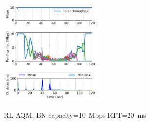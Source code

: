 \documentclass[conference]{IEEEtran}
\begin{document}
\begin{figure}[t]
\begin{center}
\includegraphics[width=0.45\textwidth]{Figures/rl_10mbps_10ms_total.pdf} \\
\includegraphics[width=0.45\textwidth]{Figures/rl_10mbps_10ms_flow.pdf} \\
\includegraphics[width=0.45\textwidth]{Figures/rl_10mbps_10ms_delay.pdf}
\end{center}
\caption{RL-AQM, BN capacity=10~Mbps RTT=20~ms}
\label{fig:rl10mbps20ms}
\end{figure}
\end{document}
